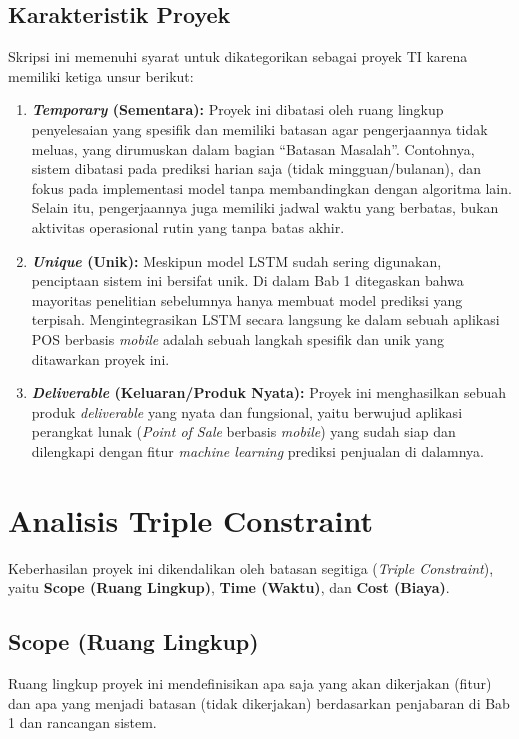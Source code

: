 \documentclass[12pt, a4paper]{article}
\begin{document}
\subsection{Karakteristik Proyek}
Skripsi ini memenuhi syarat untuk dikategorikan sebagai proyek TI karena memiliki ketiga unsur berikut:
\begin{enumerate}[label=\arabic*)]
    \item \textbf{\textit{Temporary} (Sementara):} Proyek ini dibatasi oleh ruang lingkup penyelesaian yang spesifik dan memiliki batasan agar pengerjaannya tidak meluas, yang dirumuskan dalam bagian ``Batasan Masalah''. Contohnya, sistem dibatasi pada prediksi harian saja (tidak mingguan/bulanan), dan fokus pada implementasi model tanpa membandingkan dengan algoritma lain. Selain itu, pengerjaannya juga memiliki jadwal waktu yang berbatas, bukan aktivitas operasional rutin yang tanpa batas akhir.
    \item \textbf{\textit{Unique} (Unik):} Meskipun model LSTM sudah sering digunakan, penciptaan sistem ini bersifat unik. Di dalam Bab 1 ditegaskan bahwa mayoritas penelitian sebelumnya hanya membuat model prediksi yang terpisah. Mengintegrasikan LSTM secara langsung ke dalam sebuah aplikasi POS berbasis \textit{mobile} adalah sebuah langkah spesifik dan unik yang ditawarkan proyek ini.
    \item \textbf{\textit{Deliverable} (Keluaran/Produk Nyata):} Proyek ini menghasilkan sebuah produk \textit{deliverable} yang nyata dan fungsional, yaitu berwujud aplikasi perangkat lunak (\textit{Point of Sale} berbasis \textit{mobile}) yang sudah siap dan dilengkapi dengan fitur \textit{machine learning} prediksi penjualan di dalamnya.
\end{enumerate}

\pagebreak

\section{Analisis Triple Constraint}

Keberhasilan proyek ini dikendalikan oleh batasan segitiga (\textit{Triple Constraint}), yaitu \textbf{Scope (Ruang Lingkup)}, \textbf{Time (Waktu)}, dan \textbf{Cost (Biaya)}.

\subsection{Scope (Ruang Lingkup)}
Ruang lingkup proyek ini mendefinisikan apa saja yang akan dikerjakan (fitur) dan apa yang menjadi batasan (tidak dikerjakan) berdasarkan penjabaran di Bab 1 dan rancangan sistem.
\end{document}
